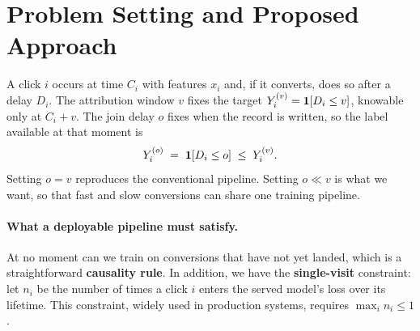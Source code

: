 \section{Problem Setting and Proposed Approach}
\label{sec:approach}

A click $i$ occurs at time $C_i$ with features $x_i$ and, if it converts, does so after a
delay $D_i$. The attribution window $v$ fixes the target $Y^{(v)}_i=\mathbf{1}[D_i\le v]$, knowable only at $C_i+v$. The join
delay $o$ fixes when the record is written, so the label available
at that moment is
\begin{equation}
  Y^{(o)}_i \;=\; \mathbf{1}\!\left[D_i \le o\right] \;\le\; Y^{(v)}_i .
  \label{eq:labels}
\end{equation}
Setting $o=v$ reproduces the conventional pipeline. Setting $o\ll v$ is what we want, so that
fast and slow conversions can share one training pipeline.

\paragraph{What a deployable pipeline must satisfy.}
At no moment can we train on conversions that have not yet landed, which is a straightforward
\textbf{causality rule}. In addition, we have the \textbf{single-visit} constraint: let $n_i$ be the number
of times a click $i$ enters the served model's loss over its lifetime. This constraint, widely used in production systems, requires
$\max_i n_i\le 1$.

